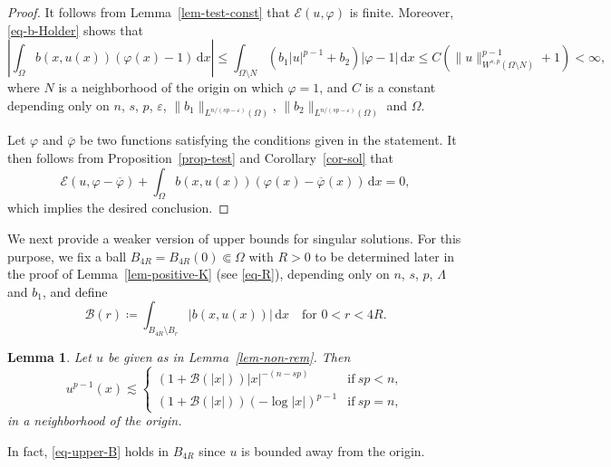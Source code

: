\documentclass[11pt]{amsart}
\theoremstyle{plain}
\newtheorem{lemma}[theorem]{Lemma}
\theoremstyle{definition}
\numberwithin{equation}{section}
\begin{document}
\begin{proof}
It follows from Lemma~\ref{lem-test-const} that $\mathcal{E}(u, \varphi)$ is finite. Moreover, \eqref{eq-b-Holder} shows that
\begin{equation*}
    \left|\int_{\Omega} b(x, u(x))(\varphi(x)-1)\,\mathrm{d}x \right| \leq \int_{\Omega \setminus N} (b_1|u|^{p-1}+b_2)|\varphi-1| \,\mathrm{d}x \leq C \left( \|u\|_{W^{s, p}(\Omega \setminus N)}^{p-1} +1 \right) < \infty,
\end{equation*}
where $N$ is a neighborhood of the origin on which $\varphi =1$, and $C$ is a constant depending only on $n$, $s$, $p$, $\varepsilon$, $\|b_1\|_{L^{n/(sp-\varepsilon)}(\Omega)}$, $\|b_2\|_{L^{n/(sp-\varepsilon)}(\Omega)}$ and $\Omega$.

Let $\varphi$ and $\overline{\varphi}$ be two functions satisfying the conditions given in the statement. It then follows from Proposition~\ref{prop-test} and Corollary~\ref{cor-sol} that
\begin{equation*}
\mathcal{E}(u, \varphi - \overline{\varphi})+\int_{\Omega} b(x, u(x))(\varphi(x)-\overline{\varphi}(x))\,\mathrm{d}x=0,
\end{equation*}
which implies the desired conclusion.
\end{proof}



We next provide a weaker version of upper bounds for singular solutions. For this purpose, we fix a ball $B_{4R}=B_{4R}(0) \Subset \Omega$ with $R>0$ to be determined later in the proof of Lemma~\ref{lem-positive-K} (see \eqref{eq-R}), depending only on $n$, $s$, $p$, $\Lambda$ and $b_1$, and define
\begin{equation*}
    \mathcal{B}(r) \coloneqq \int_{B_{4R} \setminus B_r} |b(x, u(x))|\,\mathrm{d}x \quad \text{for }0<r<4R.
\end{equation*}

\begin{lemma}\label{lem-upper}
Let $u$ be given as in Lemma~\ref{lem-non-rem}. Then
\begin{equation}\label{eq-upper-B}
u^{p-1}(x) \lesssim
\begin{cases}
(1+\mathcal{B}(|x|))|x|^{-(n-sp)} &\text{if}~sp<n, \\
(1+\mathcal{B}(|x|))(-\log |x|)^{p-1} &\text{if}~sp=n,
\end{cases}
\end{equation}
in a neighborhood of the origin.
\end{lemma}
In fact, \eqref{eq-upper-B} holds in $B_{4R}$ since $u$ is bounded away from the origin.
\end{document}
